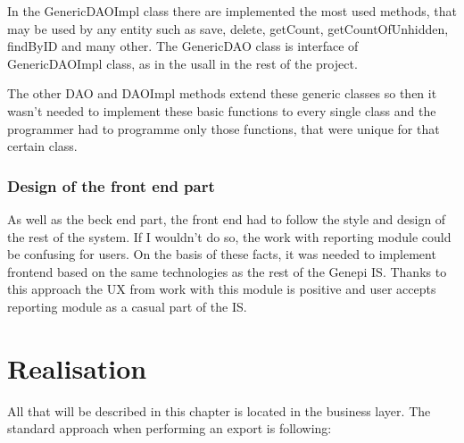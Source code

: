 \documentclass[thesis=B,english]{FITthesis}[2012/10/20]
\begin{document}
In the GenericDAOImpl class there are implemented the most used methods, that may be used by any entity such as save, delete, getCount, getCountOfUnhidden, findByID and many other. The GenericDAO class is interface of GenericDAOImpl class, as in the usall in the rest of the project.

The other DAO and DAOImpl methods extend these generic classes so then it wasn't needed to implement these basic functions to every single class and the programmer had to programme only those functions, that were unique for that certain class.

\subsection{Design of the front end part}
As well as the beck end part, the front end had to follow the style and design of the rest of the system. If I wouldn't do so, the work with reporting module could be confusing for users. On the basis of these facts, it was needed to implement frontend based on the same technologies as the rest of the Genepi IS. Thanks to this approach the UX from work with this module is positive and user accepts reporting module as a casual part of the IS.

\chapter{Realisation}
All that will be described in this chapter is located in the business layer. The standard approach when performing an export is following:
\end{document}
